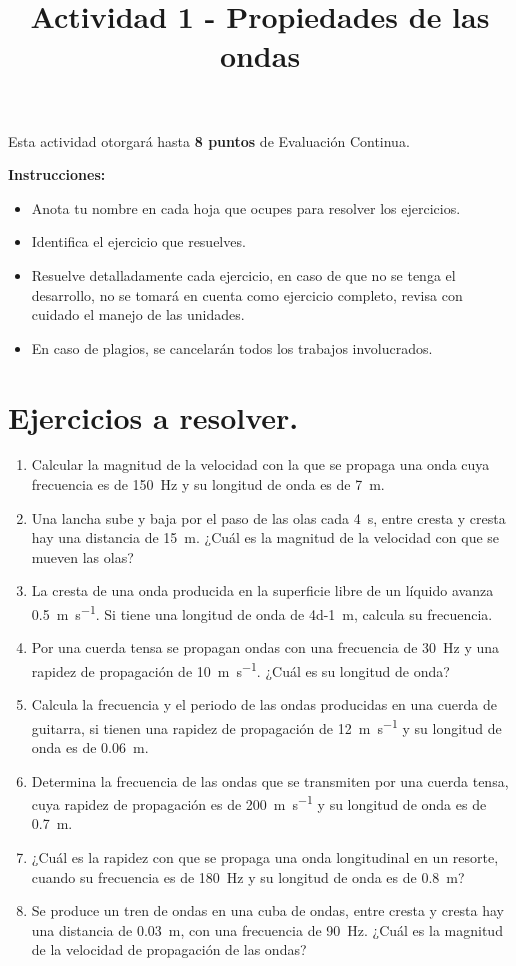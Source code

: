 \documentclass[14pt]{extarticle}
\title{\vspace*{-2cm} Actividad 1 - Propiedades de las ondas\vspace{-5ex}}
\date{}
\begin{document}
\maketitle

Esta actividad otorgará hasta \textbf{8 puntos} de Evaluación Continua.
\vspace*{0.5cm}

\textbf{Instrucciones: }
\begin{itemize}
\item Anota tu nombre en cada hoja que ocupes para resolver los ejercicios.
\item Identifica el ejercicio que resuelves.
\item Resuelve detalladamente cada ejercicio, en caso de que no se tenga el desarrollo, no se tomará en cuenta como ejercicio completo, revisa con cuidado el manejo de las unidades.
\item En caso de plagios, se cancelarán todos los trabajos involucrados.
\end{itemize}

\section*{Ejercicios a resolver.}

\begin{enumerate}
\item Calcular la magnitud de la velocidad con la que se propaga una onda cuya frecuencia es de \SI{150}{\hertz} y su longitud de onda es de \SI{7}{\meter}.
\item Una lancha sube y baja por el paso de las olas cada \SI{4}{\second}, entre cresta y cresta hay una distancia de \SI{15}{\meter}. ¿Cuál es la magnitud de la velocidad con que se mueven las olas?
\item La cresta de una onda producida en la superficie libre de un líquido avanza \SI{0.5}{\meter\per\second}. Si tiene una longitud de onda de \SI{4d-1}{\meter}, calcula su frecuencia.
\item Por una cuerda tensa se propagan ondas con una frecuencia de \SI{30}{\hertz} y una rapidez de propagación de \SI{10}{\meter\per\second}. ¿Cuál es su longitud de onda?
\item Calcula la frecuencia y el periodo de las ondas producidas en una cuerda de guitarra, si tienen una rapidez de propagación de \SI{12}{\meter\per\second} y su longitud de onda es de \SI{0.06}{\meter}.
\item Determina la frecuencia de las ondas que se transmiten por una cuerda tensa, cuya rapidez de propagación es de \SI{200}{\meter\per\second} y su longitud de onda es de \SI{0.7}{\meter}.
\item ¿Cuál es la rapidez con que se propaga una onda longitudinal en un resorte, cuando su frecuencia es de \SI{180}{\hertz} y su longitud de onda es de \SI{0.8}{\meter}?
\item Se produce un tren de ondas en una cuba de ondas, entre cresta y cresta hay una distancia de \SI{0.03}{\meter}, con una frecuencia de \SI{90}{\hertz}. ¿Cuál es la magnitud de la velocidad de propagación de las ondas?
\end{enumerate}
\end{document}
